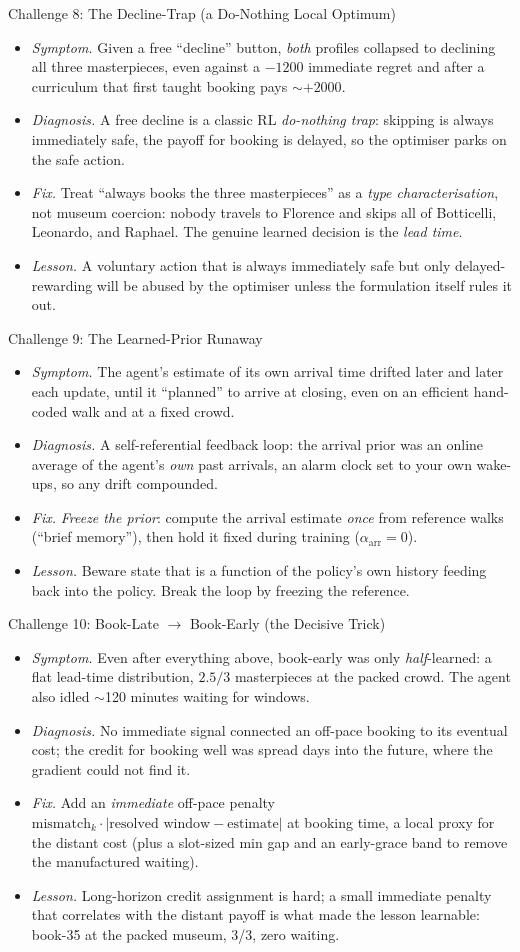 \documentclass[aspectratio=169, 11pt]{beamer}
\newcommand{\good}[1]{\textcolor{safegreen}{#1}}
\newcommand{\bad}[1]{\textcolor{crowdred}{#1}}
\newcommand{\warn}[1]{\textcolor{warnorange}{#1}}
\newcommand{\emp}[1]{\textit{#1}}
\newcommand{\sdfl}[4]{%
\begin{itemize}\setlength\itemsep{2pt}
\item[\bad{\textbf{S}}] \emp{Symptom.} #1
\item[\warn{\textbf{D}}] \emp{Diagnosis.} #2
\item[\good{\textbf{F}}] \emp{Fix.} #3
\item[\textbf{L}] \emp{Lesson.} #4
\end{itemize}}
\begin{document}
\begin{frame}{Challenge 8: The Decline-Trap (a Do-Nothing Local Optimum)}
\footnotesize
\sdfl
{Given a free ``decline'' button, \emp{both} profiles collapsed to declining all three
masterpieces, even against a $-1200$ immediate regret and after a curriculum that first
taught booking pays $\sim+2000$.}
{A free decline is a classic RL \emp{do-nothing trap}: skipping is always immediately
safe, the payoff for booking is delayed, so the optimiser parks on the safe action.}
{Treat ``always books the three masterpieces'' as a \emp{type characterisation}, not
museum coercion: nobody travels to Florence and skips all of Botticelli, Leonardo, and
Raphael. The genuine learned decision is the \emp{lead time}.}
{A voluntary action that is always immediately safe but only delayed-rewarding will be
abused by the optimiser unless the formulation itself rules it out.}
\end{frame}

\begin{frame}{Challenge 9: The Learned-Prior Runaway}
\footnotesize
\sdfl
{The agent's estimate of its own arrival time drifted later and later each update,
until it ``planned'' to arrive at closing, even on an efficient hand-coded walk and at
a fixed crowd.}
{A self-referential feedback loop: the arrival prior was an online average of the
agent's \emp{own} past arrivals, an alarm clock set to your own wake-ups, so any drift
compounded.}
{\emp{Freeze the prior}: compute the arrival estimate \emp{once} from reference walks
(``brief memory''), then hold it fixed during training ($\alpha_{\text{arr}}{=}0$).}
{Beware state that is a function of the policy's own history feeding back into the
policy. Break the loop by freezing the reference.}
\end{frame}

\begin{frame}{Challenge 10: Book-Late $\to$ Book-Early (the Decisive Trick)}
\footnotesize
\sdfl
{Even after everything above, book-early was only \emp{half}-learned: a flat lead-time
distribution, $2.5/3$ masterpieces at the packed crowd. The agent also idled $\sim$120
minutes waiting for windows.}
{No immediate signal connected an off-pace booking to its eventual cost; the credit for
booking well was spread days into the future, where the gradient could not find it.}
{Add an \emp{immediate} off-pace penalty $\text{mismatch}_k\cdot|\text{resolved window}-
\text{estimate}|$ at booking time, a local proxy for the distant cost (plus a slot-sized
min gap and an early-grace band to remove the manufactured waiting).}
{Long-horizon credit assignment is hard; a small immediate penalty that correlates with
the distant payoff is what made the lesson learnable: book-35 at the packed museum,
3/3, zero waiting.}
\end{frame}
\end{document}
